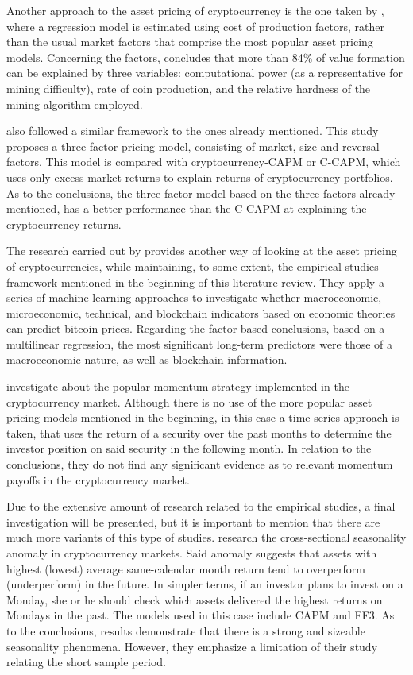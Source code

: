 Another approach to the asset pricing of cryptocurrency is the one taken by \parencite{HAYES20171308}, where a regression model is estimated using cost of production factors, rather than the usual market factors that comprise the most popular asset pricing models. Concerning the factors, \parencite{HAYES20171308} concludes that more than 84\% of value formation can be explained by three variables: computational power (as a representative for mining difficulty), rate of coin production, and the relative hardness of the mining algorithm employed.

\parencite{Shen2020} also followed a similar framework to the ones already mentioned. This study proposes a three factor pricing model, consisting of market, size and reversal factors. This model is compared with cryptocurrency-CAPM or C-CAPM, which uses only excess market returns to explain returns of cryptocurrency portfolios. As to the conclusions, the three-factor model based on the three factors already mentioned, has a better performance than the C-CAPM at explaining the cryptocurrency returns.

The research carried out by \parencite{Erfanian2022} provides another way of looking at the asset pricing of cryptocurrencies, while maintaining, to some extent, the empirical studies framework mentioned in the beginning of this literature review. They apply a series of machine learning approaches to investigate whether macroeconomic, microeconomic, technical, and blockchain indicators based on economic theories can predict bitcoin prices. Regarding the factor-based conclusions, based on a multilinear regression, the most significant long-term predictors were those of a macroeconomic nature, as well as blockchain information. 

\parencite{GROBYS20196} investigate about the popular momentum strategy implemented in the cryptocurrency market. Although there is no use of the more popular asset pricing models mentioned in the beginning, in this case a time series approach is taken, that uses the return of a security over the past months to determine the investor position on said security in the following month. In relation to the conclusions, they do not find any significant evidence as to relevant momentum payoffs in the cryptocurrency market.

Due to the extensive amount of research related to the empirical studies, a final investigation will be presented, but it is important to mention that there are much more variants of this type of studies. \parencite{Long2020} research the cross-sectional seasonality anomaly in cryptocurrency markets. Said anomaly suggests that assets with highest (lowest) average same-calendar month return tend to overperform (underperform) in the future. In simpler terms, if an investor plans to invest on a Monday, she or he should check which assets delivered the highest returns on Mondays in the past. The models used in this case include CAPM and FF3. As to the conclusions, results demonstrate that there is a strong and sizeable seasonality phenomena. However, they emphasize a limitation of their study relating the short sample period.

